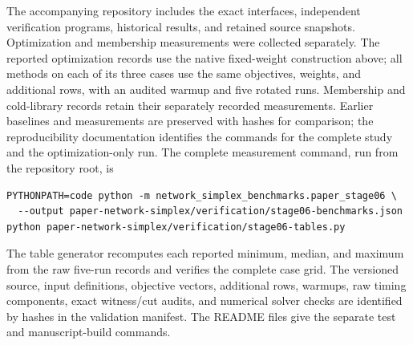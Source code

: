 The accompanying repository includes the exact interfaces, independent
verification programs, historical results, and retained source snapshots.
Optimization and membership measurements were collected separately. The
reported optimization records use the native fixed-weight construction above;
all methods on each of its three cases use the same objectives, weights, and
additional rows, with an audited warmup and five rotated runs. Membership and
cold-library records retain their separately recorded measurements. Earlier
baselines and measurements are preserved with hashes for comparison; the
reproducibility documentation identifies the commands for the complete study
and the optimization-only run.
The complete measurement command, run from the repository root, is
\begin{verbatim}
PYTHONPATH=code python -m network_simplex_benchmarks.paper_stage06 \
  --output paper-network-simplex/verification/stage06-benchmarks.json
python paper-network-simplex/verification/stage06-tables.py
\end{verbatim}
The table generator recomputes each reported minimum, median, and maximum
from the raw five-run records and verifies the complete case grid.
The versioned source, input definitions, objective vectors, additional rows,
warmups, raw timing components, exact witness/cut audits, and numerical solver
checks are identified by hashes in the validation manifest. The README files
give the separate test and manuscript-build commands.
